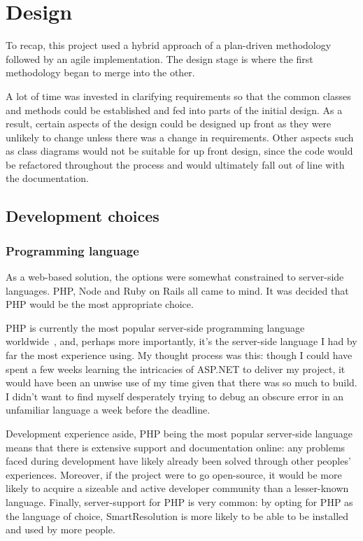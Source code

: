 \chapter{Design}

To recap, this project used a hybrid approach of a plan-driven methodology followed by an agile implementation. The design stage is where the first methodology began to merge into the other.

A lot of time was invested in clarifying requirements so that the common classes and methods could be established and fed into parts of the initial design. As a result, certain aspects of the design could be designed up front as they were unlikely to change unless there was a change in requirements. Other aspects such as class diagrams would not be suitable for up front design, since the code would be refactored throughout the process and would ultimately fall out of line with the documentation.

\section{Development choices}

\subsection{Programming language}

As a web-based solution, the options were somewhat constrained to server-side languages. PHP, Node and Ruby on Rails all came to mind. It was decided that PHP would be the most appropriate choice.

PHP is currently the most popular server-side programming language worldwide~\cite{phpPopular}, and, perhaps more importantly, it's the server-side language I had by far the most experience using. My thought process was this: though I could have spent a few weeks learning the intricacies of ASP.NET to deliver my project, it would have been an unwise use of my time given that there was so much to build. I didn't want to find myself desperately trying to debug an obscure error in an unfamiliar language a week before the deadline.

Development experience aside, PHP being the most popular server-side language means that there is extensive support and documentation online: any problems faced during development have likely already been solved through other peoples' experiences. Moreover, if the project were to go open-source, it would be more likely to acquire a sizeable and active developer community than a lesser-known language. Finally, server-support for PHP is very common: by opting for PHP as the language of choice, SmartResolution is more likely to be able to be installed and used by more people.

